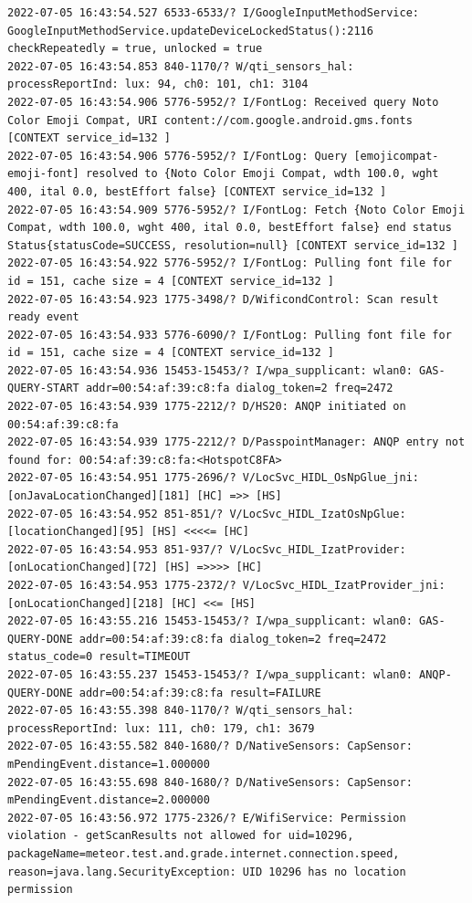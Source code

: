\documentclass[a4paper,12pt]{book}
\begin{document}
\begin{lstlisting}
2022-07-05 16:43:54.527 6533-6533/? I/GoogleInputMethodService: GoogleInputMethodService.updateDeviceLockedStatus():2116 checkRepeatedly = true, unlocked = true
2022-07-05 16:43:54.853 840-1170/? W/qti_sensors_hal: processReportInd: lux: 94, ch0: 101, ch1: 3104
2022-07-05 16:43:54.906 5776-5952/? I/FontLog: Received query Noto Color Emoji Compat, URI content://com.google.android.gms.fonts [CONTEXT service_id=132 ]
2022-07-05 16:43:54.906 5776-5952/? I/FontLog: Query [emojicompat-emoji-font] resolved to {Noto Color Emoji Compat, wdth 100.0, wght 400, ital 0.0, bestEffort false} [CONTEXT service_id=132 ]
2022-07-05 16:43:54.909 5776-5952/? I/FontLog: Fetch {Noto Color Emoji Compat, wdth 100.0, wght 400, ital 0.0, bestEffort false} end status Status{statusCode=SUCCESS, resolution=null} [CONTEXT service_id=132 ]
2022-07-05 16:43:54.922 5776-5952/? I/FontLog: Pulling font file for id = 151, cache size = 4 [CONTEXT service_id=132 ]
2022-07-05 16:43:54.923 1775-3498/? D/WificondControl: Scan result ready event
2022-07-05 16:43:54.933 5776-6090/? I/FontLog: Pulling font file for id = 151, cache size = 4 [CONTEXT service_id=132 ]
2022-07-05 16:43:54.936 15453-15453/? I/wpa_supplicant: wlan0: GAS-QUERY-START addr=00:54:af:39:c8:fa dialog_token=2 freq=2472
2022-07-05 16:43:54.939 1775-2212/? D/HS20: ANQP initiated on 00:54:af:39:c8:fa
2022-07-05 16:43:54.939 1775-2212/? D/PasspointManager: ANQP entry not found for: 00:54:af:39:c8:fa:<HotspotC8FA>
2022-07-05 16:43:54.951 1775-2696/? V/LocSvc_HIDL_OsNpGlue_jni: [onJavaLocationChanged][181] [HC] =>> [HS]
2022-07-05 16:43:54.952 851-851/? V/LocSvc_HIDL_IzatOsNpGlue: [locationChanged][95] [HS] <<<<= [HC]
2022-07-05 16:43:54.953 851-937/? V/LocSvc_HIDL_IzatProvider: [onLocationChanged][72] [HS] =>>>> [HC]
2022-07-05 16:43:54.953 1775-2372/? V/LocSvc_HIDL_IzatProvider_jni: [onLocationChanged][218] [HC] <<= [HS]
2022-07-05 16:43:55.216 15453-15453/? I/wpa_supplicant: wlan0: GAS-QUERY-DONE addr=00:54:af:39:c8:fa dialog_token=2 freq=2472 status_code=0 result=TIMEOUT
2022-07-05 16:43:55.237 15453-15453/? I/wpa_supplicant: wlan0: ANQP-QUERY-DONE addr=00:54:af:39:c8:fa result=FAILURE
2022-07-05 16:43:55.398 840-1170/? W/qti_sensors_hal: processReportInd: lux: 111, ch0: 179, ch1: 3679
2022-07-05 16:43:55.582 840-1680/? D/NativeSensors: CapSensor:  mPendingEvent.distance=1.000000
2022-07-05 16:43:55.698 840-1680/? D/NativeSensors: CapSensor:  mPendingEvent.distance=2.000000
2022-07-05 16:43:56.972 1775-2326/? E/WifiService: Permission violation - getScanResults not allowed for uid=10296, packageName=meteor.test.and.grade.internet.connection.speed, reason=java.lang.SecurityException: UID 10296 has no location permission

\end{lstlisting}
\end{document}
